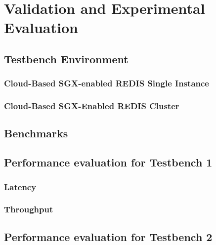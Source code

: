 
\chapter{Validation and Experimental Evaluation}
\label{cha:validation_experimental_Evaluation}

\section{Testbench Environment}
\label{sec:testbench_environment}

\subsection{Cloud-Based SGX-enabled REDIS Single Instance}
\label{ssec:cloud-based_sgx_enabled_redis_single_instance}

\subsection{Cloud-Based SGX-Enabled REDIS Cluster}
\label{ssec:cloud-based_sgx_enabled_redis_cluster}

\section{Benchmarks}
\label{sec:benchmarks}

\section{Performance evaluation for Testbench 1}
\label{sec:performance_evaluation_testbench_1}

\subsection{Latency}
\label{ssec:testbench_1_latency}

\subsection{Throughput}
\label{ssec:testbench_1_throughput}

\section{Performance evaluation for Testbench 2}
\label{sec:performance_evaluation_testbench_2}

